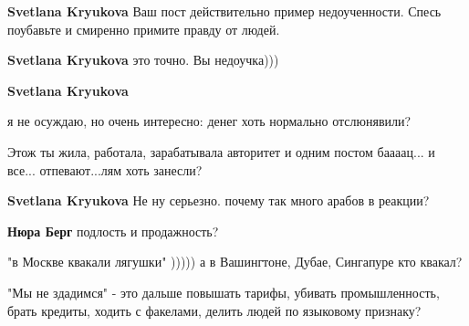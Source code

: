 \begin{itemize}
\begin{itemize}
\textbf{Svetlana Kryukova} Ваш пост действительно пример недоученности. Спесь поубавьте и смиренно примите правду от людей.

 
\textbf{Svetlana Kryukova} это точно. Вы недоучка)))

 
\textbf{Svetlana Kryukova} 

я не осуждаю, но очень интересно: денег хоть нормально отслюнявили?

Этож ты жила, работала, зарабатывала авторитет и одним постом баааац... и все...
отпевают...лям хоть занесли?

 
\textbf{Svetlana Kryukova} Не ну серьезно. почему так много арабов в реакции?

 
\textbf{Нюра Берг} подлость и продажность?

 

"в Москве квакали лягушки" ))))) а в Вашингтоне, Дубае, Сингапуре кто квакал?

"Мы не здадимся" - это дальше повышать тарифы, убивать промышленность, брать
кредиты, ходить с факелами, делить людей по языковому признаку?

 

\end{itemize}
\end{itemize}
